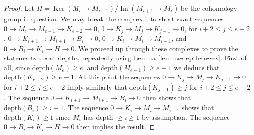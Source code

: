 \documentclass[10pt,a4paper]{amsart}
\theoremstyle{plain}
\theoremstyle{definition}
\theoremstyle{remark}
\numberwithin{equation}{subsection}
\def\Ker{\mathop{\mathrm{Ker}}}
\def\Im{\mathop{\mathrm{Im}}}
\begin{document}
\begin{proof}
Let $H = \Ker(M_i \to M_{i-1})/\Im(M_{i + 1} \to M_i)$ be the
cohomology group in question.
We may break the complex into short exact sequences
$0 \to M_e \to M_{e-1} \to K_{e-2} \to 0$,
$0 \to K_j \to M_j \to K_{j-1} \to 0$, for $i + 2 \leq j \leq e-2 $,
$0 \to K_{i + 1} \to M_{i + 1} \to B_i \to 0$,
$0 \to K_i \to M_i \to M_{i-1}$, and
$0 \to B_i \to K_i \to H \to 0$.
We proceed up through these complexes to
prove the statements about depths, repeatedly using
Lemma \ref{lemma-depth-in-ses}.
First of all, since $\text{depth}(M_e) \geq e$,
and $\text{depth}(M_{e-1}) \geq e-1$ we deduce
that $\text{depth}(K_{e-2}) \geq e - 1$. At this point the
sequences $0 \to K_j \to M_j \to K_{j-1} \to 0$ for $i + 2 \leq j \leq e-2 $
imply similarly that $\text{depth}(K_{j-1}) \geq j$ for
$i + 2 \leq j \leq e-2$. The sequence
$0 \to K_{i + 1} \to M_{i + 1} \to B_i \to 0$
then shows that $\text{depth}(B_i) \geq i + 1$. The sequence
$0 \to K_i \to M_i \to M_{i-1}$ shows that $\text{depth}(K_i) \geq 1$
since $M_i$ has depth $\geq i \geq 1$ by assumption.
The sequence $0 \to B_i \to K_i \to H \to 0$ then
implies the result.
\end{proof}
\end{document}
